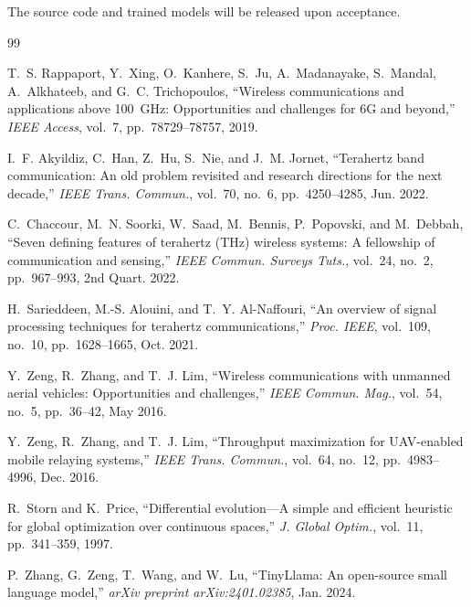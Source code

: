 \documentclass[journal]{IEEEtran}
\begin{document}
The source code and trained models will be released upon acceptance.


\balance


\begin{thebibliography}{99}

T.~S. Rappaport, Y.~Xing, O.~Kanhere, S.~Ju, A.~Madanayake, S.~Mandal, A.~Alkhateeb, and G.~C. Trichopoulos, ``Wireless communications and applications above 100~GHz: Opportunities and challenges for 6G and beyond,'' \textit{IEEE Access}, vol.~7, pp.~78729--78757, 2019.

I.~F. Akyildiz, C.~Han, Z.~Hu, S.~Nie, and J.~M. Jornet, ``Terahertz band communication: An old problem revisited and research directions for the next decade,'' \textit{IEEE Trans. Commun.}, vol.~70, no.~6, pp.~4250--4285, Jun. 2022.

C.~Chaccour, M.~N. Soorki, W.~Saad, M.~Bennis, P.~Popovski, and M.~Debbah, ``Seven defining features of terahertz (THz) wireless systems: A fellowship of communication and sensing,'' \textit{IEEE Commun. Surveys Tuts.}, vol.~24, no.~2, pp.~967--993, 2nd Quart. 2022.

H.~Sarieddeen, M.-S. Alouini, and T.~Y. Al-Naffouri, ``An overview of signal processing techniques for terahertz communications,'' \textit{Proc. IEEE}, vol.~109, no.~10, pp.~1628--1665, Oct. 2021.

Y.~Zeng, R.~Zhang, and T.~J. Lim, ``Wireless communications with unmanned aerial vehicles: Opportunities and challenges,'' \textit{IEEE Commun. Mag.}, vol.~54, no.~5, pp.~36--42, May 2016.

Y.~Zeng, R.~Zhang, and T.~J. Lim, ``Throughput maximization for UAV-enabled mobile relaying systems,'' \textit{IEEE Trans. Commun.}, vol.~64, no.~12, pp.~4983--4996, Dec. 2016.

R.~Storn and K.~Price, ``Differential evolution---A simple and efficient heuristic for global optimization over continuous spaces,'' \textit{J. Global Optim.}, vol.~11, pp.~341--359, 1997.

P.~Zhang, G.~Zeng, T.~Wang, and W.~Lu, ``TinyLlama: An open-source small language model,'' \textit{arXiv preprint arXiv:2401.02385}, Jan. 2024.


\end{thebibliography}
\end{document}
